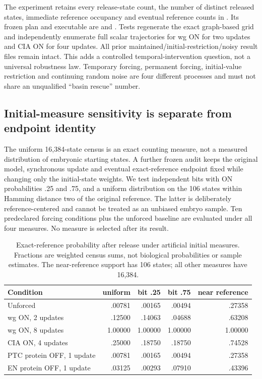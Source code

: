 The experiment retains every release-state count, the number of distinct released states, immediate reference occupancy and eventual reference counts in . Its frozen plan and executable are  and . Tests regenerate the exact graph-based grid and independently enumerate full scalar trajectories for wg ON for two updates and CIA ON for four updates. All prior maintained/initial-restriction/noisy result files remain intact. This adds a controlled temporal-intervention question, not a universal robustness law. Temporary forcing, permanent forcing, initial-value restriction and continuing random noise are four different processes and must not share an unqualified ``basin rescue'' number.

\subsection{Initial-measure sensitivity is separate from endpoint identity}
The uniform 16,384-state census is an exact counting measure, not a measured distribution of embryonic starting states. A further frozen audit keeps the original model, synchronous update and eventual exact-reference endpoint fixed while changing only the initial-state weights. We test independent bits with ON probabilities .25 and .75, and a uniform distribution on the 106 states within Hamming distance two of the original reference. The latter is deliberately reference-centered and cannot be treated as an unbiased embryo sample. Ten predeclared forcing conditions plus the unforced baseline are evaluated under all four measures. No measure is selected after its result.

\begin{table}[ht]\centering
\caption{Exact-reference probability after release under artificial initial measures. Fractions are weighted census sums, not biological probabilities or sample estimates. The near-reference support has 106 states; all other measures have 16,384.}
\begin{tabular}{lrrrr}\hline
Condition & uniform & bit .25 & bit .75 & near reference\\\hline
Unforced &.00781&.00165&.00494&.27358\\
wg ON, 2 updates &.12500&.14063&.04688&.63208\\
wg ON, 8 updates &1.00000&1.00000&1.00000&1.00000\\
CIA ON, 4 updates &.25000&.18750&.18750&.74528\\
PTC protein OFF, 1 update &.00781&.00165&.00494&.27358\\
EN protein OFF, 1 update &.03125&.00293&.07910&.43396\\\hline
\end{tabular}\end{table}

